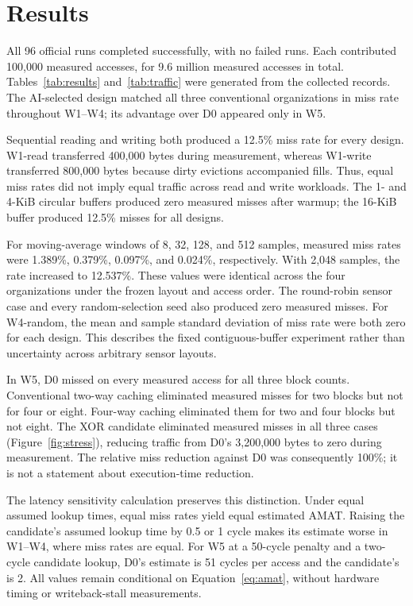 \documentclass[11pt,a4paper]{article}
\begin{document}
\section{Results}
All 96 official runs completed successfully, with no failed runs. Each contributed 100,000 measured accesses, for 9.6 million measured accesses in total. Tables~\ref{tab:results} and~\ref{tab:traffic} were generated from the collected records. The AI-selected design matched all three conventional organizations in miss rate throughout W1--W4; its advantage over D0 appeared only in W5.

Sequential reading and writing both produced a 12.5\% miss rate for every design. W1-read transferred 400,000 bytes during measurement, whereas W1-write transferred 800,000 bytes because dirty evictions accompanied fills. Thus, equal miss rates did not imply equal traffic across read and write workloads. The 1- and 4-KiB circular buffers produced zero measured misses after warmup; the 16-KiB buffer produced 12.5\% misses for all designs.

For moving-average windows of 8, 32, 128, and 512 samples, measured miss rates were 1.389\%, 0.379\%, 0.097\%, and 0.024\%, respectively. With 2,048 samples, the rate increased to 12.537\%. These values were identical across the four organizations under the frozen layout and access order. The round-robin sensor case and every random-selection seed also produced zero measured misses. For W4-random, the mean and sample standard deviation of miss rate were both zero for each design. This describes the fixed contiguous-buffer experiment rather than uncertainty across arbitrary sensor layouts.

In W5, D0 missed on every measured access for all three block counts. Conventional two-way caching eliminated measured misses for two blocks but not for four or eight. Four-way caching eliminated them for two and four blocks but not eight. The XOR candidate eliminated measured misses in all three cases (Figure~\ref{fig:stress}), reducing traffic from D0's 3,200,000 bytes to zero during measurement. The relative miss reduction against D0 was consequently 100\%; it is not a statement about execution-time reduction.

The latency sensitivity calculation preserves this distinction. Under equal assumed lookup times, equal miss rates yield equal estimated AMAT. Raising the candidate's assumed lookup time by 0.5 or 1 cycle makes its estimate worse in W1--W4, where miss rates are equal. For W5 at a 50-cycle penalty and a two-cycle candidate lookup, D0's estimate is 51 cycles per access and the candidate's is 2. All values remain conditional on Equation~\ref{eq:amat}, without hardware timing or writeback-stall measurements.
\end{document}
